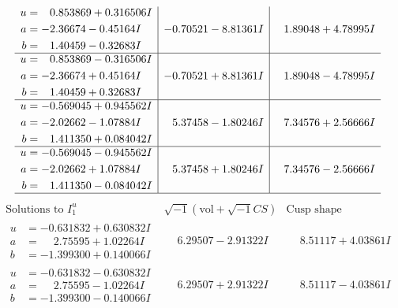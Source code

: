 \documentclass[1p]{elsarticle_modified}
\theoremstyle{definition}
\newcommand{\I}{\sqrt{-1}}
\begin{document}
$$\begin{array}{c|c|c}
\begin{aligned}
u &= \phantom{-}0.853869 + 0.316506 I \\
a &= -2.36674 - 0.45164 I \\
b &= \phantom{-}1.40459 - 0.32683 I\end{aligned}
 & -0.70521 - 8.81361 I & \phantom{-}1.89048 + 4.78995 I \\ \hline\begin{aligned}
u &= \phantom{-}0.853869 - 0.316506 I \\
a &= -2.36674 + 0.45164 I \\
b &= \phantom{-}1.40459 + 0.32683 I\end{aligned}
 & -0.70521 + 8.81361 I & \phantom{-}1.89048 - 4.78995 I \\ \hline\begin{aligned}
u &= -0.569045 + 0.945562 I \\
a &= -2.02662 - 1.07884 I \\
b &= \phantom{-}1.411350 + 0.084042 I\end{aligned}
 & \phantom{-}5.37458 - 1.80246 I & \phantom{-}7.34576 + 2.56666 I \\ \hline\begin{aligned}
u &= -0.569045 - 0.945562 I \\
a &= -2.02662 + 1.07884 I \\
b &= \phantom{-}1.411350 - 0.084042 I\end{aligned}
 & \phantom{-}5.37458 + 1.80246 I & \phantom{-}7.34576 - 2.56666 I\\
 \hline 
 \end{array}$$\newpage$$\begin{array}{c|c|c}  
\text{Solutions to }I^u_{1}& \I (\text{vol} + \sqrt{-1}CS) & \text{Cusp shape}\\
 \hline 
\begin{aligned}
u &= -0.631832 + 0.630832 I \\
a &= \phantom{-}2.75595 + 1.02264 I \\
b &= -1.399300 + 0.140066 I\end{aligned}
 & \phantom{-}6.29507 - 2.91322 I & \phantom{-}8.51117 + 4.03861 I \\ \hline\begin{aligned}
u &= -0.631832 - 0.630832 I \\
a &= \phantom{-}2.75595 - 1.02264 I \\
b &= -1.399300 - 0.140066 I\end{aligned}
 & \phantom{-}6.29507 + 2.91322 I & \phantom{-}8.51117 - 4.03861 I \\ \hline\begin{aligned}

\end{aligned}
\end{array}$$
\end{document}
